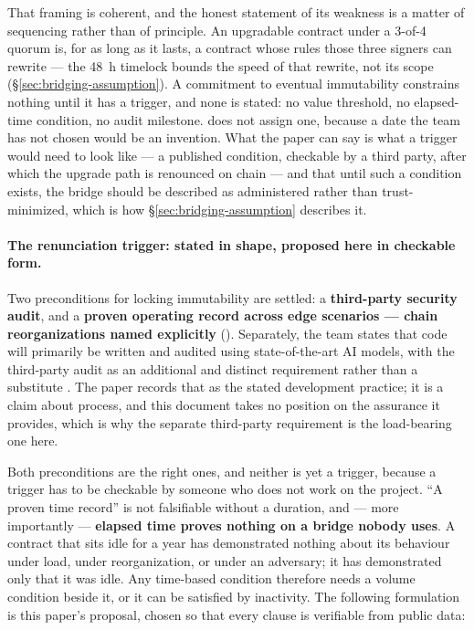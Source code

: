 \begin{remark}
\begin{remark}
That framing is coherent, and the honest statement of its weakness is a matter of sequencing rather
than of principle. An upgradable contract under a 3-of-4 quorum is, for as long as it lasts, a
contract whose rules those three signers can rewrite --- the \SI{48}{\hour} timelock bounds the speed
of that rewrite, not its scope (\S\ref{sec:bridging-assumption}). A commitment to eventual immutability
constrains nothing until it has a trigger, and none is stated: no value threshold, no elapsed-time
condition, no audit milestone.  does not assign one, because a date the
team has not chosen would be an invention. What the paper can say is what a trigger would need to
look like --- a published condition, checkable by a third party, after which the upgrade path is
renounced on chain --- and that until such a condition exists, the bridge should be described as
administered rather than trust-minimized, which is how \S\ref{sec:bridging-assumption} describes it.
\paragraph{The renunciation trigger: stated in shape, proposed here in checkable form.} Two
preconditions for locking immutability are settled: a \textbf{third-party security audit}, and a
\textbf{proven operating record across edge scenarios --- chain reorganizations named explicitly}
 (\planned). Separately, the team states that code will
primarily be written and audited using state-of-the-art AI models, with the third-party audit as an
additional and distinct requirement rather than a substitute
. The paper records that as the stated development
practice; it is a claim about process, and this document takes no position on the assurance it
provides, which is why the separate third-party requirement is the load-bearing one here.

Both preconditions are the right ones, and neither is yet a trigger, because a trigger has to be
checkable by someone who does not work on the project. ``A proven time record'' is not falsifiable
without a duration, and --- more importantly --- \textbf{elapsed time proves nothing on a bridge
nobody uses}. A contract that sits idle for a year has demonstrated nothing about its behaviour
under load, under reorganization, or under an adversary; it has demonstrated only that it was idle.
Any time-based condition therefore needs a volume condition beside it, or it can be satisfied by
inactivity. The following formulation is this paper's proposal, chosen so that every clause is
verifiable from public data:


\end{remark}
\end{remark}
